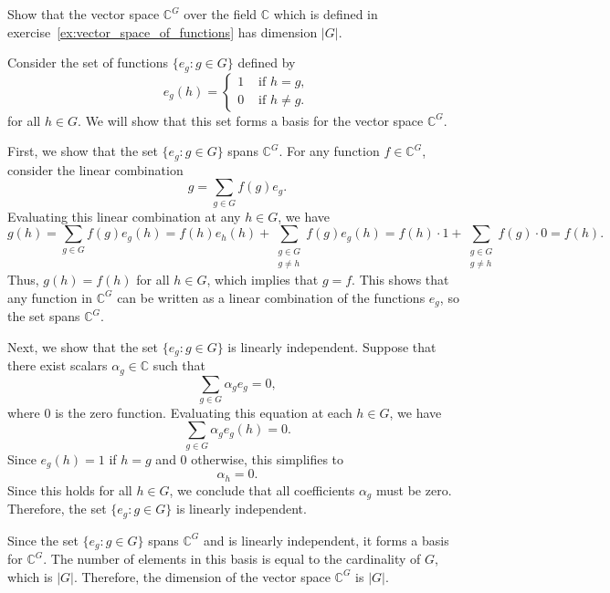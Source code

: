 \documentclass{elegantbook}
\begin{document}
\begin{exercise} \label{ex:dimension_of_function_vector_space}
  Show that the vector space $\mathbb{C}^{G}$ over the field $\mathbb{C}$ which is defined in exercise~\ref{ex:vector_space_of_functions} has dimension $|G|$.
\end{exercise}

\begin{solution}
  Consider the set of functions $\{ e_g : g \in G \}$ defined by
  \[
    e_g(h) = \begin{cases}
      1 & \text{ if } h = g, \\
      0 & \text{ if } h \ne g.
    \end{cases}
  \]
  for all $h \in G$. We will show that this set forms a basis for the vector space $\mathbb{C}^{G}$.

  First, we show that the set $\{ e_g : g \in G \}$ spans $\mathbb{C}^{G}$. For any function $f \in \mathbb{C}^{G}$, consider the linear combination
  \[
    g = \sum_{g \in G} f(g) e_g.
  \]
  Evaluating this linear combination at any $h \in G$, we have
  \[
    g(h) = \sum_{g \in G} f(g) e_g(h)= f(h) e_h(h) + \sum_{\substack{g \in G \\ g \ne h}} f(g) e_g(h) = f(h) \cdot 1 + \sum_{\substack{g \in G \\ g \ne h}} f(g) \cdot 0 = f(h).
  \]
  Thus, $g(h) = f(h)$ for all $h \in G$, which implies that $g = f$.
  This shows that any function in $\mathbb{C}^{G}$ can be written as a linear combination of the functions $e_g$, so the set spans $\mathbb{C}^{G}$.

  Next, we show that the set $\{ e_g : g \in G \}$ is linearly independent. Suppose that there exist scalars $\alpha_g \in \mathbb{C}$ such that
  \[
    \sum_{g \in G} \alpha_g e_g = 0,
  \]
  where $0$ is the zero function. Evaluating this equation at each $h \in G$, we have
  \[
    \sum_{g \in G} \alpha_g e_g(h) = 0.
  \]
  Since $e_g(h) = 1$ if $h = g$ and $0$ otherwise, this simplifies to
  \[
    \alpha_h = 0.
  \]
  Since this holds for all $h \in G$, we conclude that all coefficients $\alpha_g$ must be zero. Therefore, the set $\{ e_g : g \in G \}$ is linearly independent.

  Since the set $\{ e_g : g \in G \}$ spans $\mathbb{C}^{G}$ and is linearly independent, it forms a basis for $\mathbb{C}^{G}$. The number of elements in this basis is equal to the cardinality of $G$, which is $|G|$. Therefore, the dimension of the vector space $\mathbb{C}^{G}$ is $|G|$.
\end{solution}
\end{document}
